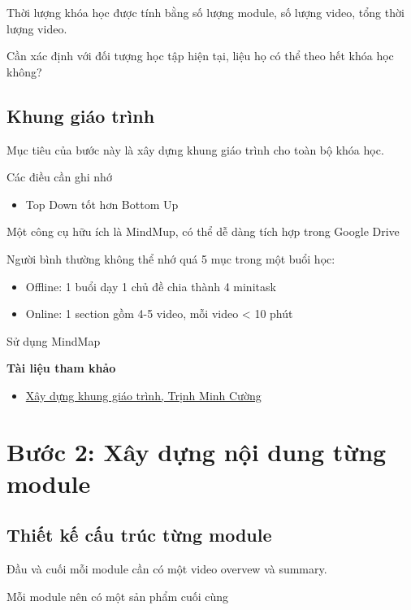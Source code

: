 Thời lượng khóa học được tính bằng số lượng module, số lượng video, tổng thời lượng video.

Cần xác định với đối tượng học tập hiện tại, liệu họ có thể theo hết khóa học không?

\subsection{Khung giáo trình}

Mục tiêu của bước này là xây dựng khung giáo trình cho toàn bộ khóa học.

Các điều cần ghi nhớ

\begin{itemize}
  \item Top Down tốt hơn Bottom Up
\end{itemize}

Một công cụ hữu ích là MindMup, có thể dễ dàng tích hợp trong Google Drive

Người bình thường không thể nhớ quá 5 mục trong một buổi học:

\begin{itemize}
  \item Offline: 1 buổi dạy 1 chủ đề chia thành 4 minitask
  \item Online: 1 section gồm 4-5 video, mỗi video < 10 phút
\end{itemize}

Sử dụng MindMap

\textbf{Tài liệu tham khảo}

\begin{itemize}
  \item \href{https://techmaster.vn/khoa-hoc-online/25484/tro-thanh-giang-vien-gioi/3263/Xay-dung-khung-giao-trinh}{Xây dựng khung giáo trình, Trịnh Minh Cường}
\end{itemize}

\section{Bước 2: Xây dựng nội dung từng module}

\subsection{Thiết kế cấu trúc từng module}

Đầu và cuối mỗi module cần có một video overvew và summary.

Mỗi module nên có một sản phẩm cuối cùng

